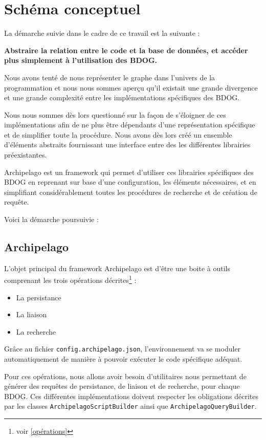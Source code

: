 \documentclass[a4paper,fleqn,12pt]{report}
\begin{document}
\section{Schéma conceptuel}

La démarche suivie dans le cadre de ce travail est la suivante :

\begin{center}
\textbf{Abstraire la relation entre le code et la base de données, et accéder plus simplement à l’utilisation des BDOG. }
\end{center} 

Nous avons tenté de nous représenter le graphe dans l'univers de la programmation et nous nous sommes aperçu qu'il existait une grande divergence et une grande complexité entre les implémentations spécifiques des BDOG.

Nous nous sommes dès lors questionné sur la façon de s'éloigner de ces implémentations afin de ne plus être dépendants d'une représentation spécifique et de simplifier toute la procédure. Nous avons dès lors créé un ensemble d'éléments abstraits fournissant une interface entre des les différentes librairies préexistantes.

Archipelago est un framework qui permet d'utiliser ces librairies spécifiques des BDOG en reprenant sur base d’une configuration, les éléments nécessaires, et en simplifiant considérablement toutes les procédures de recherche et de création de requête.

Voici la démarche poursuivie :

\newpage
\subsection{Archipelago}

L'objet principal du framework Archipelago est d'être une boite à outils comprenant les trois opérations décrites\footnote{voir \ref{opérations}} :
\begin{itemize}
\item La persistance
\item La liaison
\item La recherche
\end{itemize}

Grâce au fichier \texttt{config.archipelago.json}, l'environnement va se moduler automatiquement de manière à pouvoir exécuter le code spécifique adéquat.

Pour ces opérations, nous allons avoir besoin d'utilitaires nous permettant de générer des requêtes de persistance, de liaison et de recherche, pour chaque BDOG. Ces différentes implémentations doivent respecter les obligations décrites par les classes \texttt{ArchipelagoScriptBuilder} ainsi que \texttt{ArchipelagoQueryBuilder}.
\end{document}
